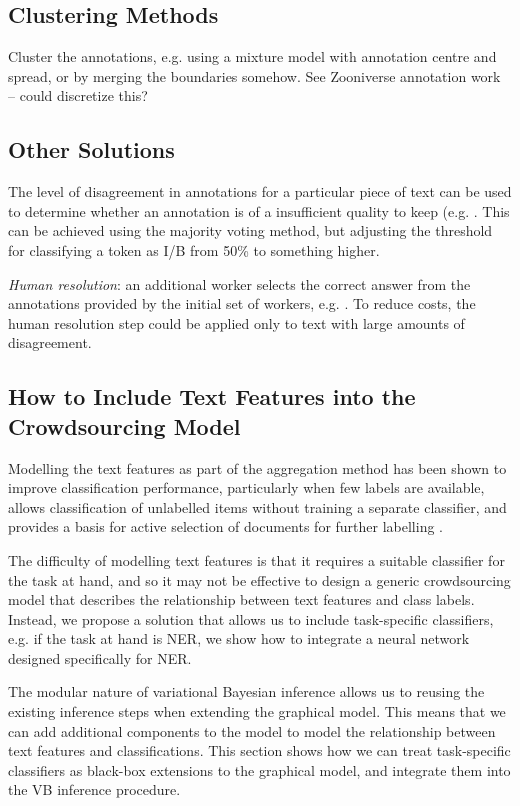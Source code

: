 \subsection{Clustering Methods}

Cluster the annotations, e.g. using a mixture model with annotation centre and spread, or by merging the boundaries somehow. See Zooniverse annotation work -- could discretize this?

\subsection{Other Solutions}

The level of disagreement in annotations for a particular piece of text can be used to determine whether an annotation is of a insufficient quality to keep (e.g. \cite{sayeed2011crowdsourcing,hsueh2009data}. This can be achieved using the majority voting method, but adjusting the threshold for classifying a token as I/B from 50\% to something higher. 

\emph{Human resolution}: an additional worker selects the correct answer from the annotations provided by the initial set of workers, e.g. \cite{dagan2016specifying}. To reduce costs, the human resolution step could be applied only to text with large amounts of disagreement.

\subsection{How to Include Text Features into the Crowdsourcing Model}

Modelling the text features as part of the aggregation method has been shown to improve classification performance, particularly when few labels are available, allows classification of unlabelled items without training a separate classifier, and provides a basis for active selection of documents for further labelling \cite{settles2010active}.

The difficulty of modelling text features is that it requires a suitable classifier for the task at hand, and so it may not be effective to design a generic crowdsourcing model that describes the relationship between text features and class labels. Instead, we propose a solution that allows us to include task-specific classifiers, e.g. if the task at hand is NER, we show how to integrate a neural network designed specifically for NER.

The modular nature of variational Bayesian inference allows us to reusing the existing inference steps when extending the graphical model. This means that we can add additional components to the model to model the relationship between text features and classifications. This section shows how we can treat task-specific classifiers as black-box extensions to the graphical model, and integrate them into the VB inference procedure. 
